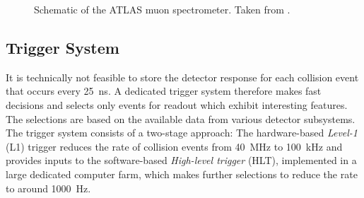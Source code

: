 
\FloatBarrier
\begin{figure}[t]
    \caption{Schematic of the ATLAS muon spectrometer. Taken from .}
    \label{fig:ATLASmuonspectrometer}
\end{figure}



\subsection{Trigger System}
\label{sec:trigger-system}
It is technically not feasible to store the detector response for each collision event that occurs every \SI{25}{\nano\second}.
A dedicated trigger system therefore makes fast decisions and selects only events for readout which exhibit interesting features.
The selections are based on the available data from various detector subsystems.
The \RunTwo trigger system consists of a two-stage approach:
The hardware-based \emph{Level-1} (L1) trigger reduces the rate of collision events from \SI{40}{\mega\hertz} to \SI{100}{\kilo\hertz} and provides inputs to the software-based \emph{High-level trigger} (HLT), implemented in a large dedicated computer farm, which makes further selections to reduce the rate to around \SI{1000}{\hertz}.

